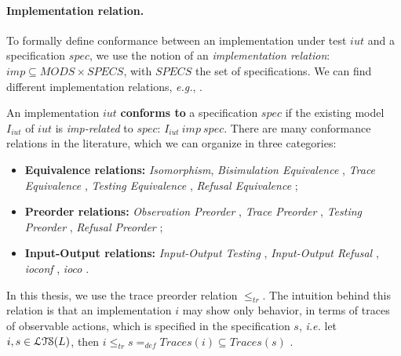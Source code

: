 \paragraph{Implementation relation.} To formally define
conformance between an implementation under test $iut$ and a
specification $spec$, we use the notion of an
\emph{implementation relation}: $imp \subseteq MODS \times
SPECS$, with $SPECS$ the set of specifications. We can find
different implementation relations, \emph{e.g.},
\cite{Bri88,phalippou94}.

An implementation $iut$ \textbf{conforms to} a specification
$spec$ if the existing model $I_{iut}$ of $iut$ is
\textit{imp-related} to $spec$: $I_{iut} ~imp~ spec$.
There are many conformance relations in the literature, which we
can organize in three categories:

\begin{itemize}
    \item \textbf{Equivalence relations:} \emph{Isomorphism},
        \emph{Bisimulation Equivalence}
        \cite{milner1989communication,Fernandez89animplementation},
        \emph{Trace Equivalence} \cite{tan_testing_1995},
        \emph{Testing Equivalence} \cite{Abramsky1987225},
        \emph{Refusal Equivalence} \cite{Phillips86};

    \item \textbf{Preorder relations:} \emph{Observation
        Preorder} \cite{milner1980calculus,hennessy1980observing},
        \emph{Trace Preorder}
        \cite{DNH84,vaandrager1991relationship},
        \emph{Testing Preorder} \cite{DNH84,Beohar2015},
        \emph{Refusal Preorder} \cite{phillips1987refusal};

    \item \textbf{Input-Output relations:} \emph{Input-Output
        Testing} \cite{Tre96}, \emph{Input-Output Refusal}
        \cite{heerink1997refusal}, \emph{ioconf}
        \cite{tretmans1996conformance}, \emph{ioco} \cite{Tre96}.
\end{itemize}

In this thesis, we use the trace preorder relation $\leq_{tr}$.
The intuition behind this relation is that an implementation $i$
may show only behavior, in terms of traces of observable
actions, which is specified in the specification $s$, \emph{i.e.}
let $i, s \in \EuScript{LTS}(L)$, then $i \leq_{tr} s =_{def}
Traces(i) \subseteq Traces(s)$ \cite{Tre96}.

